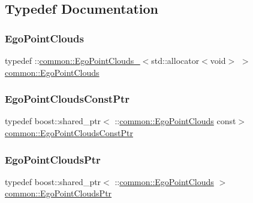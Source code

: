 \subsection{Typedef Documentation}
\mbox{\label{namespacecommon_a6cbd2086f9b345d169e432c35ffecf4d}} 
\subsubsection{\texorpdfstring{Ego\+Point\+Clouds}{EgoPointClouds}}
{\footnotesize\ttfamily typedef \+::\hyperlink{structcommon_1_1EgoPointClouds__}{common\+::\+Ego\+Point\+Clouds\+\_\+}$<$std\+::allocator$<$void$>$ $>$ \hyperlink{namespacecommon_a6cbd2086f9b345d169e432c35ffecf4d}{common\+::\+Ego\+Point\+Clouds}}

\mbox{\label{namespacecommon_ac9ac5560cc07d92a2ece5e0a9f70952c}} 
\subsubsection{\texorpdfstring{Ego\+Point\+Clouds\+Const\+Ptr}{EgoPointCloudsConstPtr}}
{\footnotesize\ttfamily typedef boost\+::shared\+\_\+ptr$<$ \+::\hyperlink{namespacecommon_a6cbd2086f9b345d169e432c35ffecf4d}{common\+::\+Ego\+Point\+Clouds} const$>$ \hyperlink{namespacecommon_ac9ac5560cc07d92a2ece5e0a9f70952c}{common\+::\+Ego\+Point\+Clouds\+Const\+Ptr}}

\mbox{\label{namespacecommon_a079a4e76c38ec190f07e5cd2b7da05e0}} 
\subsubsection{\texorpdfstring{Ego\+Point\+Clouds\+Ptr}{EgoPointCloudsPtr}}
{\footnotesize\ttfamily typedef boost\+::shared\+\_\+ptr$<$ \+::\hyperlink{namespacecommon_a6cbd2086f9b345d169e432c35ffecf4d}{common\+::\+Ego\+Point\+Clouds} $>$ \hyperlink{namespacecommon_a079a4e76c38ec190f07e5cd2b7da05e0}{common\+::\+Ego\+Point\+Clouds\+Ptr}}

